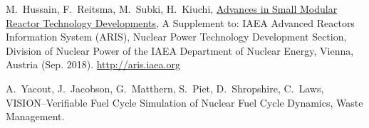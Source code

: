 \documentclass[preprint]{elsarticle}
\begin{document}
\begin{thebibliography}{10}
M.~Hussain, F.~Reitsma, M.~Subki, H.~Kiuchi,
  \href{http://aris.iaea.org}{Advances in {Small} {Modular} {Reactor}
  {Technology} {Developments}}, A {Supplement} to: {IAEA} {Advanced} {Reactors}
  {Information} {System} ({ARIS}), Nuclear Power Technology Development
  Section, Division of Nuclear Power of the IAEA Department of Nuclear Energy,
  Vienna, Austria (Sep. 2018).
\newline\urlprefix\url{http://aris.iaea.org}

A.~Yacout, J.~Jacobson, G.~Matthern, S.~Piet, D.~Shropshire, C.~Laws,
  {VISION}–{Verifiable} {Fuel} {Cycle} {Simulation} of {Nuclear} {Fuel}
  {Cycle} {Dynamics}, Waste Management.

\end{thebibliography}


%
\end{document}
